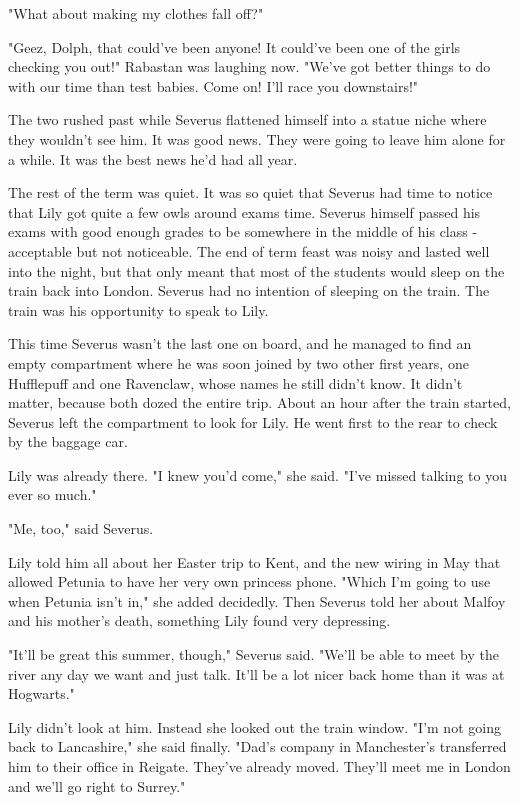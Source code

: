 \documentclass[a4paper,11pt]{article}
\begin{document}
"What about making my clothes fall off?"

"Geez, Dolph, that could've been anyone! It could've been one of the girls checking you out!" Rabastan was laughing now. "We've got better things to do with our time than test babies. Come on! I'll race you downstairs!"

The two rushed past while Severus flattened himself into a statue niche where they wouldn't see him. It was good news. They were going to leave him alone for a while. It was the best news he'd had all year.

The rest of the term was quiet. It was so quiet that Severus had time to notice that Lily got quite a few owls around exams time. Severus himself passed his exams with good enough grades to be somewhere in the middle of his class - acceptable but not noticeable. The end of term feast was noisy and lasted well into the night, but that only meant that most of the students would sleep on the train back into London. Severus had no intention of sleeping on the train. The train was his opportunity to speak to Lily.

This time Severus wasn't the last one on board, and he managed to find an empty compartment where he was soon joined by two other first years, one Hufflepuff and one Ravenclaw, whose names he still didn't know. It didn't matter, because both dozed the entire trip. About an hour after the train started, Severus left the compartment to look for Lily. He went first to the rear to check by the baggage car.

Lily was already there. "I knew you'd come," she said. "I've missed talking to you ever so much."

"Me, too," said Severus.

Lily told him all about her Easter trip to Kent, and the new wiring in May that allowed Petunia to have her very own princess phone. "Which I'm going to use when Petunia isn't in," she added decidedly. Then Severus told her about Malfoy and his mother's death, something Lily found very depressing.

"It'll be great this summer, though," Severus said. "We'll be able to meet by the river any day we want and just talk. It'll be a lot nicer back home than it was at Hogwarts."

Lily didn't look at him. Instead she looked out the train window. "I'm not going back to Lancashire," she said finally. "Dad's company in Manchester's transferred him to their office in Reigate. They've already moved. They'll meet me in London and we'll go right to Surrey."
\end{document}
